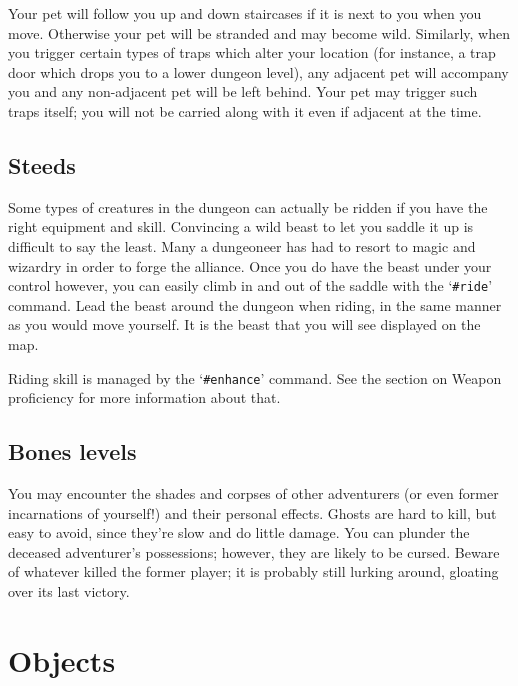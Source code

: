 Your pet will follow you up and down staircases if it is next to you
when you move.  Otherwise your pet will be stranded and may become
wild.  Similarly, when you trigger certain types of traps which alter
your location (for instance, a trap door which drops you to a lower
dungeon level), any adjacent pet will accompany you and any non-adjacent
pet will be left behind.  Your pet may trigger such traps itself; you
will not be carried along with it even if adjacent at the time.

\subsection*{Steeds}

Some types of creatures in the dungeon can actually be ridden if you
have the right equipment and skill.  Convincing a wild beast to let
you saddle it up is difficult to say the least.  Many a dungeoneer
has had to resort to magic and wizardry in order to forge the alliance.
Once you do have the beast under your control however, you can
easily climb in and out of the saddle with the `{\tt \#ride}' command.  Lead
the beast around the dungeon when riding, in the same manner as
you would move yourself.  It is the beast that you will see displayed
on the map.

Riding skill is managed by the `{\tt \#enhance}' command.  See the section
on Weapon proficiency for more information about that.

\subsection*{Bones levels}

You may encounter the shades and corpses of other adventurers (or even
former incarnations of yourself!) and their personal effects.  Ghosts
are hard to kill, but easy to avoid, since they're slow and do little
damage.  You can plunder the deceased adventurer's possessions;
however, they are likely to be cursed.  Beware of whatever killed the
former player; it is probably still lurking around, gloating over its
last victory.

\section{Objects}

